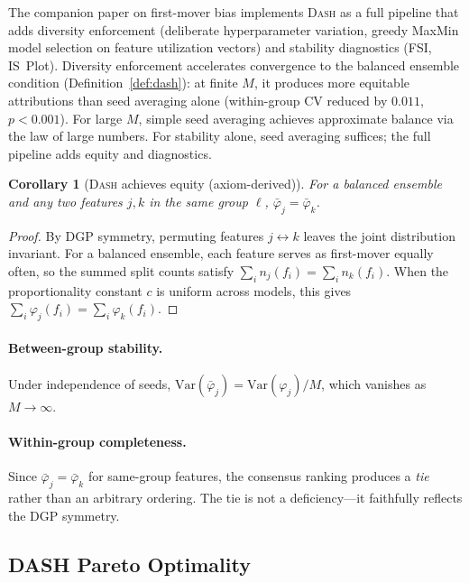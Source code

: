 \documentclass{article}
\newtheorem{corollary}[theorem]{Corollary}
\newcommand{\Var}{\mathrm{Var}}
\newcommand{\DASH}{\textsc{Dash}}
\begin{document}
The companion paper on first-mover bias \citep{caraker2026firstmover} implements \DASH{} as a full pipeline that adds diversity enforcement (deliberate hyperparameter variation, greedy MaxMin model selection on feature utilization vectors) and stability diagnostics (FSI, IS~Plot). Diversity enforcement accelerates convergence to the balanced ensemble condition (Definition~\ref{def:dash}): at finite $M$, it produces more equitable attributions than seed averaging alone (within-group CV reduced by $0.011$, $p < 0.001$). For large $M$, simple seed averaging achieves approximate balance via the law of large numbers. For stability alone, seed averaging suffices; the full pipeline adds equity and diagnostics.

\begin{corollary}[\DASH{} achieves equity (axiom-derived)]
\label{cor:equity}
For a balanced ensemble and any two features $j, k$ in the same group $\ell$, $\bar{\varphi}_j = \bar{\varphi}_k$.
\end{corollary}

\begin{proof}
By DGP symmetry, permuting features $j \leftrightarrow k$ leaves the joint distribution invariant. For a balanced ensemble, each feature serves as first-mover equally often, so the summed split counts satisfy $\sum_i n_j(f_i) = \sum_i n_k(f_i)$. When the proportionality constant $c$ is uniform across models, this gives $\sum_i \varphi_j(f_i) = \sum_i \varphi_k(f_i)$.
\end{proof}

\paragraph{Between-group stability.}
Under independence of seeds, $\Var(\bar{\varphi}_j) = \Var(\varphi_j) / M$, which vanishes as $M \to \infty$.

\paragraph{Within-group completeness.}
Since $\bar{\varphi}_j = \bar{\varphi}_k$ for same-group features, the consensus ranking produces a \emph{tie} rather than an arbitrary ordering. The tie is not a deficiency---it faithfully reflects the DGP symmetry.

\subsection{DASH Pareto Optimality}
\label{sec:dash-pareto}
\end{document}
